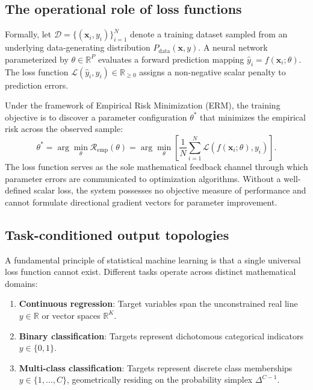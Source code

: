 \documentclass[../../../main.tex]{subfiles}
\begin{document}
\subsection{The operational role of loss functions}
\label{subsec:loss_functions_role}

Formally, let $\mathcal{D} = \{(\mathbf{x}_i, y_i)\}_{i=1}^N$ denote a training dataset sampled from an underlying data-generating distribution $P_{\text{data}}(\mathbf{x}, y)$. A neural network parameterized by $\theta \in \mathbb{R}^P$ evaluates a forward prediction mapping $\hat{y}_i = f(\mathbf{x}_i; \theta)$. The loss function $\mathcal{L}(\hat{y}_i, y_i) \in \mathbb{R}_{\ge 0}$ assigns a non-negative scalar penalty to prediction errors.

Under the framework of Empirical Risk Minimization (ERM), the training objective is to discover a parameter configuration $\theta^*$ that minimizes the empirical risk across the observed sample:
\begin{equation}
\theta^* = \arg\min_{\theta} \mathcal{R}_{\text{emp}}(\theta) = \arg\min_{\theta} \left[ \frac{1}{N} \sum_{i=1}^N \mathcal{L}\left( f(\mathbf{x}_i; \theta), y_i \right) \right].
\end{equation}
The loss function serves as the sole mathematical feedback channel through which parameter errors are communicated to optimization algorithms. Without a well-defined scalar loss, the system possesses no objective measure of performance and cannot formulate directional gradient vectors for parameter improvement.

\subsection{Task-conditioned output topologies}
\label{subsec:output_topologies}

A fundamental principle of statistical machine learning is that a single universal loss function cannot exist. Different tasks operate across distinct mathematical domains:
\begin{enumerate}[label=(\roman*)]
    \item \textbf{Continuous regression}: Target variables span the unconstrained real line $y \in \mathbb{R}$ or vector spaces $\mathbb{R}^K$.
    \item \textbf{Binary classification}: Targets represent dichotomous categorical indicators $y \in \{0, 1\}$.
    \item \textbf{Multi-class classification}: Targets represent discrete class memberships $y \in \{1, \dots, C\}$, geometrically residing on the probability simplex $\Delta^{C-1}$.
\end{enumerate}
\end{document}
